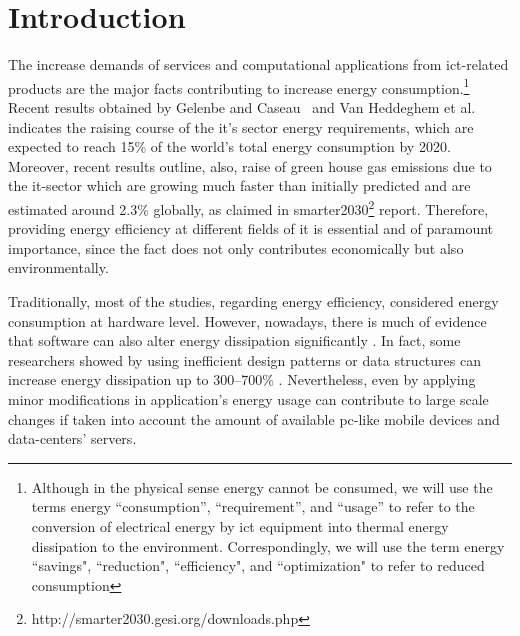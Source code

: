 \section{Introduction}
The increase demands of services and computational applications 
from {\sc ict}-related products are the major facts contributing 
to increase energy consumption.{\footnote{Although in the physical sense energy 
		cannot be consumed, we will use the terms energy ``consumption'', 
		``requirement'', and ``usage'' to refer to the conversion of 
		electrical energy by {\sc ict} equipment into thermal energy 
		dissipation to the environment. 
		Correspondingly, we will use the term energy ``savings", 
		``reduction", ``efficiency", and ``optimization" to refer 
		to reduced consumption}} 
Recent results obtained by Gelenbe and Caseau~ and 
Van Heddeghem et al.~ indicates the 
raising course of the {\sc it}'s sector energy requirements, which are 
expected to reach 15\% of the world's total energy consumption 
by 2020. 
Moreover, recent results outline, also, raise of green house gas 
emissions due to the {\sc it}-sector which are growing much faster 
than initially predicted and are estimated around 2.3\% globally, as 
claimed in {\sc smart}er2030\footnote{http://smarter2030.gesi.org/downloads.php} 
report.
Therefore, providing energy efficiency at different fields of 
{\sc it} is essential and of paramount importance, since the fact 
does not only contributes economically but also environmentally. 

Traditionally, most of the studies, regarding energy efficiency, 
considered energy consumption at hardware level. 
However, nowadays, there is much of evidence that software can also 
alter energy dissipation significantly \cite{eder_energy_consumptions, 
capra_is_2012, ferreira_seflab_2013}. 
In fact, some researchers showed by using inefficient design patterns 
or data structures can increase energy dissipation up to
300--700\% \cite{sahin_initial_2012, hasan_energy_profile_for_java_collection_classes_2016}. 
Nevertheless, even by applying minor modifications in application's 
energy usage can contribute to large scale changes if taken into 
account the amount of available {\sc pc}-like mobile devices and 
data-centers' servers.


